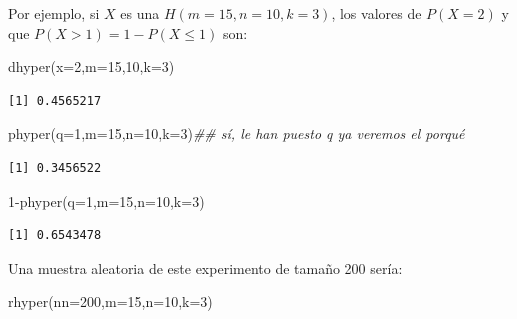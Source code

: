 \documentclass[
  letterpaper,
  DIV=11,
  numbers=noendperiod]{scrreprt}
\newenvironment{Shaded}{\begin{snugshade}}{\end{snugshade}}
\newcommand{\AttributeTok}[1]{\textcolor[rgb]{0.40,0.45,0.13}{#1}}
\newcommand{\DecValTok}[1]{\textcolor[rgb]{0.68,0.00,0.00}{#1}}
\newcommand{\DocumentationTok}[1]{\textcolor[rgb]{0.37,0.37,0.37}{\textit{#1}}}
\newcommand{\FunctionTok}[1]{\textcolor[rgb]{0.28,0.35,0.67}{#1}}
\newcommand{\NormalTok}[1]{\textcolor[rgb]{0.00,0.23,0.31}{#1}}
\newcommand{\SpecialCharTok}[1]{\textcolor[rgb]{0.37,0.37,0.37}{#1}}
\begin{document}
Por ejemplo, si \(X\) es una \(H(m=15,n=10,k=3)\), los valores de
\(P(X=2)\) y que \(P(X>1)=1-P(X\leq 1)\) son:

\begin{Shaded}
\begin{Highlighting}[]
\FunctionTok{dhyper}\NormalTok{(}\AttributeTok{x=}\DecValTok{2}\NormalTok{,}\AttributeTok{m=}\DecValTok{15}\NormalTok{,}\DecValTok{10}\NormalTok{,}\AttributeTok{k=}\DecValTok{3}\NormalTok{)}
\end{Highlighting}
\end{Shaded}

\begin{verbatim}
[1] 0.4565217
\end{verbatim}

\begin{Shaded}
\begin{Highlighting}[]
\FunctionTok{phyper}\NormalTok{(}\AttributeTok{q=}\DecValTok{1}\NormalTok{,}\AttributeTok{m=}\DecValTok{15}\NormalTok{,}\AttributeTok{n=}\DecValTok{10}\NormalTok{,}\AttributeTok{k=}\DecValTok{3}\NormalTok{)}\DocumentationTok{\#\# sí, le han puesto q ya veremos el porqué}
\end{Highlighting}
\end{Shaded}

\begin{verbatim}
[1] 0.3456522
\end{verbatim}

\begin{Shaded}
\begin{Highlighting}[]
\DecValTok{1}\SpecialCharTok{{-}}\FunctionTok{phyper}\NormalTok{(}\AttributeTok{q=}\DecValTok{1}\NormalTok{,}\AttributeTok{m=}\DecValTok{15}\NormalTok{,}\AttributeTok{n=}\DecValTok{10}\NormalTok{,}\AttributeTok{k=}\DecValTok{3}\NormalTok{)}
\end{Highlighting}
\end{Shaded}

\begin{verbatim}
[1] 0.6543478
\end{verbatim}

Una muestra aleatoria de este experimento de tamaño 200 sería:

\begin{Shaded}
\begin{Highlighting}[]
\FunctionTok{rhyper}\NormalTok{(}\AttributeTok{nn=}\DecValTok{200}\NormalTok{,}\AttributeTok{m=}\DecValTok{15}\NormalTok{,}\AttributeTok{n=}\DecValTok{10}\NormalTok{,}\AttributeTok{k=}\DecValTok{3}\NormalTok{)}
\end{Highlighting}
\end{Shaded}
\end{document}
